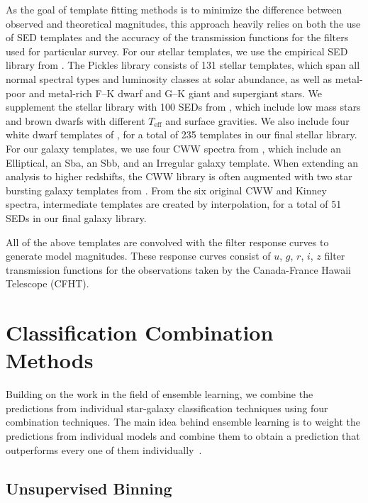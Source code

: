 As the goal of template fitting methods is to minimize
the difference between observed and theoretical magnitudes,
this approach heavily relies on
both the use of SED templates and
the accuracy of the transmission functions
for the filters used for particular survey.
For our stellar templates,
we use the empirical SED library from \citet{pickles1998stellar}.
The Pickles library consists of 131 stellar templates,
which span all normal spectral types
and luminosity classes at solar abundance,
as well as metal-poor and metal-rich F--K dwarf 
and G--K giant and supergiant stars.
We supplement the stellar library with
100 SEDs from \citet{chabrier2000evolutionary},
which include low mass stars and brown dwarfs
with different $T_{\mathrm{eff}}$ and surface gravities.
We also include four white dwarf templates of
\citet*{bohlin1995white}, for a total of 235 templates
in our final stellar library.  
For our galaxy templates,
we use four CWW spectra from \cite*{coleman1980colors},
which include an Elliptical, an Sba, an Sbb,
and an Irregular galaxy template.
When extending an analysis to higher redshifts,
the CWW library is often augmented with
two star bursting galaxy templates from \cite{kinney1996template}.
From the six original CWW and Kinney spectra,
intermediate templates are created by interpolation,
for a total of 51 SEDs in our final galaxy library.

All of the above templates are convolved
with the filter response curves to generate model magnitudes.
These response curves consist of
$u$, $g$, $r$, $i$, $z$ filter transmission functions
for the observations taken by the
Canada-France Hawaii Telescope (CFHT).


\section{Classification Combination Methods}
  \label{section:classification_combination_methods}

Building on the work in the field of ensemble learning,
we combine the predictions from
individual star-galaxy classification techniques
using four combination techniques.
The main idea behind ensemble learning is to weight
the predictions from individual models
and combine them to obtain a prediction
that outperforms every one of 
them individually~\citep{rokach2010ensemble}.

\subsection{Unsupervised Binning}
  \label{section:random_atlas}

